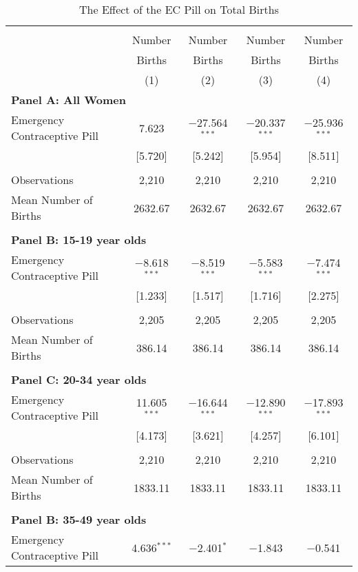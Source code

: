 \begin{table}[!htbp] \centering
\caption{The Effect of the EC Pill on Total Births}
\label{TEENtab:aggregate}
\begin{tabular}{@{\extracolsep{5pt}}lcccc}
\\[-1.8ex]\hline \hline \\[-1.8ex] 
& Number& Number & Number & Number \\
& Births& Births & Births & Births \\
&(1)&(2)&(3)&(4) \\ \hline
\multicolumn{5}{l}{\textbf{
\noindent Panel A: All Women}} \\
Emergency Contraceptive Pill&7.623&$-$27.564$^{***}$&$-$20.337$^{***}$&$-$25.936$^{***}$\\
            &[5.720]&[5.242]&[5.954]&[8.511]\\
 & & & & \\
Observations&2,210&2,210&2,210&2,210\\
Mean Number of Births&2632.67&2632.67&2632.67&2632.67\\
 & & & & \\
\multicolumn{5}{l}{\noindent \textbf{
Panel B: 15-19 year olds}} \\
Emergency Contraceptive Pill&$-$8.618$^{***}$&$-$8.519$^{***}$&$-$5.583$^{***}$&$-$7.474$^{***}$\\
            &[1.233]&[1.517]&[1.716]&[2.275]\\
 & & & & \\
Observations&2,205&2,205&2,205&2,205\\
Mean Number of Births&386.14&386.14&386.14&386.14\\
 & & & & \\
\multicolumn{5}{l}{\noindent \textbf{
Panel C: 20-34 year olds}} \\
Emergency Contraceptive Pill&11.605$^{***}$&$-$16.644$^{***}$&$-$12.890$^{***}$&$-$17.893$^{***}$\\
            &[4.173]&[3.621]&[4.257]&[6.101]\\
 & & & & \\
Observations&2,210&2,210&2,210&2,210\\
Mean Number of Births&1833.11&1833.11&1833.11&1833.11\\
 & & & & \\
\multicolumn{5}{l}{\noindent \textbf{
Panel B: 35-49 year olds}} \\
Emergency Contraceptive Pill&4.636$^{***}$&$-$2.401$^{*}$&$-$1.843&$-$0.541\\

\end{tabular}
\end{table}
